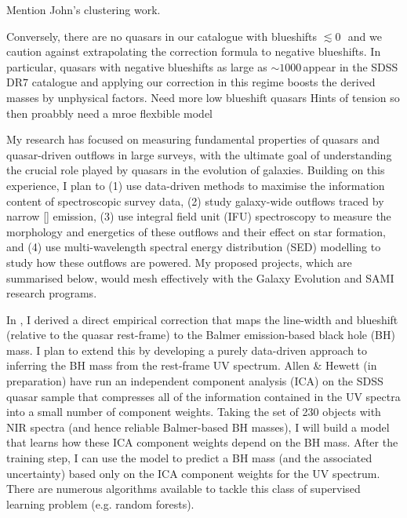 Mention John's clustering work. 

Conversely, there are no quasars in our catalogue with  blueshifts $\lesssim0$\,\kms\, and we caution against extrapolating the correction formula to negative blueshifts.
In particular, quasars with negative blueshifts as large as $\sim1000$\,\kms appear in the SDSS DR$7$ catalogue and applying our correction in this regime boosts the derived masses by unphysical factors.    
Need more low blueshift quasars
Hints of tension so then proabbly need a mroe flexbible model

My research has focused on measuring fundamental properties of quasars and quasar-driven outflows in large surveys, with the ultimate goal of understanding the crucial role played by quasars in the evolution of galaxies.
Building on this experience, I plan to (1) use data-driven methods to maximise the information content of spectroscopic survey data, (2) study galaxy-wide outflows traced by narrow [] emission, (3) use integral field unit (IFU) spectroscopy to measure the morphology and energetics of these outflows and their effect on star formation, and (4) use multi-wavelength spectral energy distribution (SED) modelling to study how these outflows are powered.  
My proposed projects, which are summarised below, would mesh effectively with the Galaxy Evolution and SAMI research programs. 

In \citet{coatman17}, I derived a direct empirical correction that maps the  line-width and blueshift (relative to the quasar rest-frame) to the Balmer emission-based black hole (BH) mass. 
I plan to extend this by developing a purely data-driven approach to inferring the BH mass from the rest-frame UV spectrum. 
Allen \& Hewett (in preparation) have run an independent component analysis (ICA) on the SDSS quasar sample that compresses all of the information contained in the UV spectra into a small number of component weights.
Taking the set of 230 objects with NIR spectra (and hence reliable Balmer-based BH masses), I will build a model that learns how these ICA component weights depend on the BH mass. 
After the training step, I can use the model to predict a BH mass (and the associated uncertainty) based only on the ICA component weights for the UV spectrum.
There are numerous algorithms available to tackle this class of supervised learning problem (e.g. random forests). 

